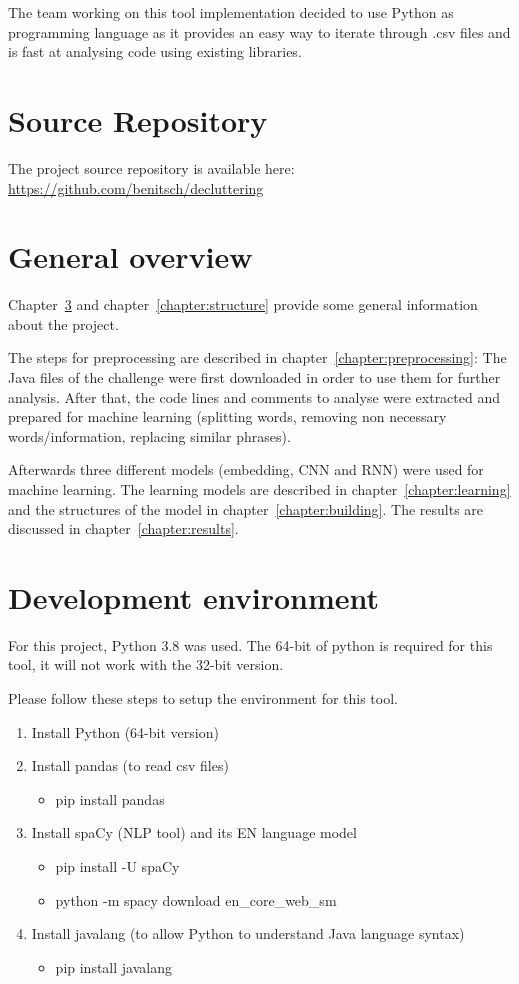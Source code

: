 \documentclass[runningheads]{llncs}
\begin{document}
The team working on this tool implementation decided to use Python as programming language as it provides an easy way to iterate through .csv files and is fast at analysing code using existing libraries.


\section{Source Repository}
The project source repository is available here: \url{https://github.com/benitsch/decluttering}


\newpage
\section{General overview}
Chapter~\ref{chapter:env} and chapter~\ref{chapter:structure} provide some general information about the project.

The steps for preprocessing are described in chapter~\ref{chapter:preprocessing}: The Java files of the challenge were first downloaded in order to use them for further analysis. After that, the code lines and comments to analyse were extracted and prepared for machine learning (splitting words, removing non necessary words/information, replacing similar phrases).

Afterwards three different models (embedding, CNN and RNN) were used for machine learning. The learning models are described in chapter~\ref{chapter:learning} and the structures of the model in chapter~\ref{chapter:building}. 
The results are discussed in chapter~\ref{chapter:results}.


\section{Development environment}\label{chapter:env}
For this project, Python 3.8 was used. The 64-bit of python is required for this tool, it will not work with the 32-bit version.

Please follow these steps to setup the environment for this tool.
\begin{enumerate}
\item Install Python (64-bit version) \cite{ref_python}
\item Install pandas (to read csv files) \cite{ref_pandas}
\begin{itemize}\item pip install pandas\end{itemize}
\item Install spaCy (NLP tool) \cite{ref_spacy} and its EN language model \cite{ref_spacy_model}
\begin{itemize}\item pip install -U spaCy
\item python -m spacy download en\_core\_web\_sm
\end{itemize}
\item Install javalang (to allow Python to understand Java language syntax) \cite{ref_javalang}
\begin{itemize}\item pip install javalang\end{itemize}
\end{enumerate}
\end{document}
